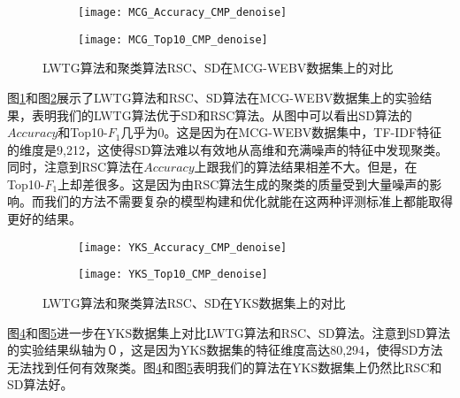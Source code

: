 \begin{figure}[!htbp]
    \centering
    \begin{subfigure}[b]{0.5\textwidth}
      \texttt{[image: MCG\_Accuracy\_CMP\_denoise]}
      \caption{}
      \label{fig:MCG_Accuracy_CMP_denoise}
    \end{subfigure}%
    \begin{subfigure}[b]{0.5\textwidth}
      \texttt{[image: MCG\_Top10\_CMP\_denoise]}
      \caption{}
      \label{fig:MCG_Top10_CMP_denoise}
    \end{subfigure}
    \caption{LWTG算法和聚类算法RSC、SD在MCG-WEBV数据集上的对比}
    \label{fig:MCG_CMP_denoise}
\end{figure}
图\ref{fig:MCG_Accuracy_CMP_denoise}和图\ref{fig:MCG_Top10_CMP_denoise}展示了LWTG算法和RSC、SD算法在MCG-WEBV数据集上的实验结果，表明我们的LWTG算法优于SD和RSC算法。从图中可以看出SD算法的$Accuracy$和Top10-$F_1$几乎为0。这是因为在MCG-WEBV数据集中，TF-IDF特征的维度是9,212，这使得SD算法难以有效地从高维和充满噪声的特征中发现聚类。同时，注意到RSC算法在$Accuracy$上跟我们的算法结果相差不大。但是，在Top10-$F_1$上却差很多。这是因为由RSC算法生成的聚类的质量受到大量噪声的影响。而我们的方法不需要复杂的模型构建和优化就能在这两种评测标准上都能取得更好的结果。

\begin{figure}[!htbp]
    \centering
    \begin{subfigure}[b]{0.5\textwidth}
      \texttt{[image: YKS\_Accuracy\_CMP\_denoise]}
      \caption{}
      \label{fig:YKS_Accuracy_CMP_denoise}
    \end{subfigure}%
    \begin{subfigure}[b]{0.5\textwidth}
      \texttt{[image: YKS\_Top10\_CMP\_denoise]}
      \caption{}
      \label{fig:YKS_Top10_CMP_denoise}
    \end{subfigure}
    \caption{LWTG算法和聚类算法RSC、SD在YKS数据集上的对比}
    \label{fig:YKS_CMP_denoise}
\end{figure}

图\ref{fig:YKS_Accuracy_CMP_denoise}和图\ref{fig:YKS_Top10_CMP_denoise}进一步在YKS数据集上对比LWTG算法和RSC、SD算法。注意到SD算法的实验结果纵轴为０，这是因为YKS数据集的特征维度高达80,294，使得SD方法无法找到任何有效聚类。图\ref{fig:YKS_Accuracy_CMP_denoise}和图\ref{fig:YKS_Top10_CMP_denoise}表明我们的算法在YKS数据集上仍然比RSC和SD算法好。

